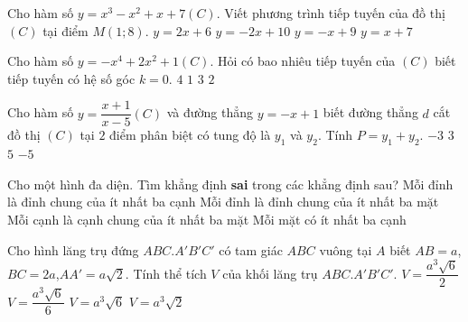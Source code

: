 \begin{ex}%
	Cho hàm số $y=x^3-x^2+x+7 (C)$. Viết phương trình tiếp tuyến của đồ thị $(C)$ tại điểm $M(1;8).$
	\choice
	{\True $y=2x+6$}
	{$y=-2x+10$}
	{$y=-x+9$}
	{$y=x+7$}
\end{ex}
\begin{ex}%
	Cho hàm số $y=-x^4+2x^2+1 (C)$. Hỏi có bao nhiêu tiếp tuyến của $(C)$ biết tiếp tuyến có hệ số góc $k=0.$ 
	\choice
	{$4$}
	{$1$}
	{$3$}
	{\True $2$}
\end{ex}
\begin{ex}%
	Cho hàm số $y=\dfrac{x+1}{x-5} (C)$ và đường thẳng $y=-x+1$ biết đường thẳng $d$ cắt đồ thị $(C)$ tại $2$ điểm phân biệt có tung độ là $y_1$ và $y_2$. Tính $P=y_1+y_2.$
	\choice
	{\True $-3$}
	{$3$}
	{$5$}
	{$-5$}
\end{ex}
\begin{ex}%
		Cho một hình đa diện. Tìm khẳng định {\bf sai} trong các khẳng định sau?
	\choice
	{Mỗi đỉnh là đỉnh chung của ít nhất ba cạnh}
	{Mỗi đỉnh là đỉnh chung của ít nhất ba mặt}
	{\True Mỗi cạnh là cạnh chung của ít nhất ba mặt}
	{Mỗi mặt có ít nhất ba cạnh}
		
\end{ex}
\begin{ex}%
	Cho hình lăng trụ đứng $ABC.A'B'C'$ có tam giác $ABC$ vuông tại $A$ biết $AB=a$, $BC=2a$,$  AA'=a\sqrt{2}$. Tính thể tích $V$ của khối  lăng trụ $ABC.A'B'C'.$
	\choice
	{\True $V=\dfrac{a^3\sqrt{6}}{2}$}
	{$V=\dfrac{a^3\sqrt{6}}{6}$}
	{$V=a^3\sqrt{6}$}
	{$V=a^3\sqrt{2}$}
\end{ex}
